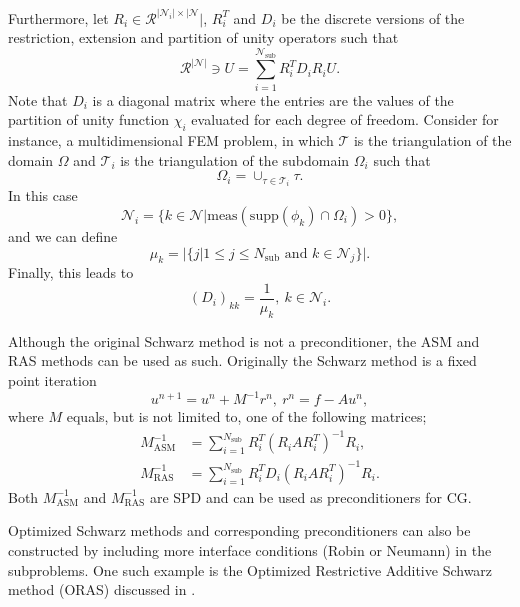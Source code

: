 Furthermore, let $R_i\in\mathcal{R}^{|\mathcal{N}_i| \times |\mathcal{N}}|$, $R_i^T$ and $D_i$ be the discrete versions of the restriction, extension and partition of unity operators such that
\[
    \mathcal{R}^{|\mathcal{N}|}\ni U = \sum_{i=1}^{\mathcal{N}_{\text{sub}}} R_i^T D_i R_i U.
\]
Note that $D_i$ is a diagonal matrix where the entries are the values of the partition of unity function $\chi_i$ evaluated for each degree of freedom. Consider for instance, a multidimensional FEM problem, in which $\mathcal{T}$ is the triangulation of the domain $\Omega$ and $\mathcal{T}_i$ is the triangulation of the subdomain $\Omega_i$ such that \cite[Equation 1.27]{schwarz_methods_Dolean_2015}
\[
    \Omega_i = \cup_{\tau \in \mathcal{T}_i} \tau.
\]
In this case \cite[Equation 1.28]{schwarz_methods_Dolean_2015}
\[
    \mathcal{N}_i = \{k\in\mathcal{N}| \text{meas}(\text{supp}(\phi_k)\cap\Omega_i)>0\},
\]
and we can define
\[
    \mu_k = |\{j| 1\leq j \leq N_{\text{sub}} \text{ and } k\in\mathcal{N}_j\}|.
\]
Finally, this leads to
\begin{equation}
    (D_i)_{kk} = \frac{1}{\mu_k}, \ k \in \mathcal{N}_i.
    \label{eq:schwarz_partition_of_unity_FEM}
\end{equation}

Although the original Schwarz method is not a preconditioner, the ASM and RAS methods can be used as such. Originally the Schwarz method is a fixed point iteration \cite[Definitions 1.12 and 1.13]{schwarz_methods_Dolean_2015}
\[
    u^{n+1} = u^n + M^{-1}r^n, \ r^n = f - A u^n,
\]
where $M$ equals, but is not limited to, one of the following matrices;
\begin{subequations}
    \begin{align}
        M^{-1}_{\text{ASM}} & = \sum_{i=1}^{N_{\text{sub}}} R_i^T (R_i A R_i^T)^{-1} R_i, \label{eq:ASM_preconditioner}     \\
        M^{-1}_{\text{RAS}} & = \sum_{i=1}^{N_{\text{sub}}} R_i^T D_i (R_i A R_i^T)^{-1} R_i \label{eq:RAS_preconditioner}.
    \end{align}
\end{subequations}
Both $M^{-1}_{\text{ASM}}$ and $M^{-1}_{\text{RAS}}$ are SPD and can be used as preconditioners for CG.

Optimized Schwarz methods and corresponding preconditioners can also be constructed by including more interface conditions (Robin or Neumann) in the subproblems. One such example is the Optimized Restrictive Additive Schwarz method (ORAS) discussed in \cite[Chapter 2]{schwarz_methods_Dolean_2015}.

